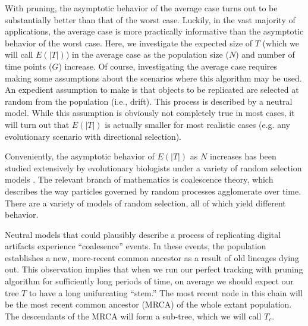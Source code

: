 
With pruning, the asymptotic behavior of the average case turns out to be substantially better than that of the worst case. 
Luckily, in the vast majority of applications, the average case is more practically informative than the asymptotic behavior of the worst case.
Here, we investigate the expected size of $T$ (which we will call $E(|T|)$) in the average case as the population size ($N$) and number of time points ($G$) increase.
Of course, investigating the average case requires making some assumptions about the scenarios where this algorithm may be used.
An expedient assumption to make is that objects to be replicated are selected at random from the population (i.e., drift).
This process is described by a neutral model.
While this assumption is obviously not completely true in most cases, it will turn out that $E(|T|)$ is actually smaller for most realistic cases (e.g. any evolutionary scenario with directional selection).

Conveniently, the asymptotic behavior of $E(|T|)$ as $N$ increases has been studied extensively by evolutionary biologists under a variety of random selection models \citep{berestyckiRecentProgressCoalescent2009, tellierCoalescenceMultipleBranching2014, nordborgCoalescentTheory2019}.
The relevant branch of mathematics is coalescence theory, which describes the way particles governed by random processes agglomerate over time.
There are a variety of models of random selection, all of which yield different behavior.

Neutral models that could plausibly describe a process of replicating digital artifacts experience ``coalesence'' events.
In these events, the population establishes a new, more-recent common ancestor as a result of old lineages dying out.
This observation implies that when we run our perfect tracking with pruning algorithm for sufficiently long periods of time, on average we should expect our tree $T$ to have a long unifurcating ``stem.''
The most recent node in this chain will be the most recent common ancestor (MRCA) of the whole extant population.
The descendants of the MRCA will form a sub-tree, which we will call $T_c$.

